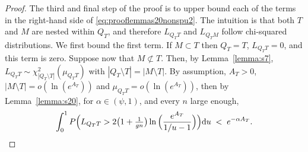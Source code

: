 \documentclass[
  12pt]{article}
\begin{document}
\begin{proof}
The third and final step of the proof is to upper bound each of the terms in the right-hand side of \eqref{eq:prooflemmas20nonspu2}. The intuition is that both $T$ and $M$ are nested within $Q_T$, and therefore $L_{Q_T T}$ and $L_{Q_T M}$ follow chi-squared distributions.
We first bound the first term. %
If $M \subset T$ then $Q_T=T$, $L_{Q_TT}=0$, and this term is zero. Suppose now that $M \not\subset T$. %
Then, by Lemma~\ref{lemma:s7}, %
$L_{Q_TT} \sim \mathcal{\chi}_{|Q_T\setminus T|}^2(\mu_{Q_TT})$ with $|Q_T\setminus T|=|M\setminus T|$. By assumption, $A_T>0$, $|M\setminus T|=o(\ln(e^{A_T}))$ and $\mu_{Q_TT}=o(\ln(e^{A_T}))$, then  by Lemma~\ref{lemma:s20}, for $\alpha\in(\psi,1)$, and every $n$ large enough,
\begin{equation}\label{eq:boundLQSprob}
\int_0^1P\Bigl(L_{Q_TT}>2\big(1+\tfrac{1}{gn}\big)\ln{\Bigl(\frac{e^{A_T}}{1 / u-1}\Bigl)}\Bigl){\rm d}u \;<\; 
e^{-\alpha A_T}.
\end{equation}


\end{proof}
\end{document}
